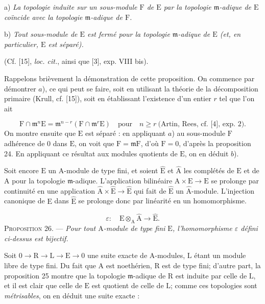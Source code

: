 a) \emph{La topologie induite sur un sous-module $\mathrm{F}$ de $\mathrm{E}$ par la topologie $\mathfrak{m}$-adique de $\mathrm{E}$ coïncide avec la topologie $\mathfrak{m}$-adique de $\mathrm{F}$.}

b) \emph{Tout sous-module de $\mathrm{E}$ est fermé pour la topologie $\mathfrak{m}$-adique de $\mathrm{E}$ (et, en particulier, $\mathrm{E}$ est séparé).}

(Cf. [15], \emph{loc. cit.}, ainsi que [3], exp. VIII bis).

Rappelons brièvement la démonstration de cette proposition. On commence par démontrer $a$), ce qui peut se faire, soit en utilisant la théorie de la décomposition primaire (Krull, cf. [15]), soit en établissant l'existence d'un entier $r$ tel que l'on ait

\begin{equation*}
\mathrm{F} \cap \mathfrak{m}^n \mathrm{E} = \mathfrak{m}^{n-r}(\mathrm{F} \cap \mathfrak{m}^r \mathrm{E}) \quad \mbox{pour} \quad n \geqslant r \ \mbox{(Artin, Rees, cf. [4], exp. 2).}
\end{equation*}
On montre ensuite que $\mathrm{E}$ est séparé : en appliquant $a$) au sous-module $\mathrm{F}$ adhérence de $0$ dans $\mathrm{E}$, on voit que $\mathrm{F} = \mathfrak{m}\mathrm{F}$, d'où $\mathrm{F} = 0$, d'après la proposition 24. En appliquant ce résultat aux modules quotients de $\mathrm{E}$, on en déduit $b$).

Soit encore $\mathrm{E}$ un $\mathrm{A}$-module de type fini, et soient $\hat{\mathrm{E}}$ et $\hat{\mathrm{A}}$ les complétés de $\mathrm{E}$ et de $\mathrm{A}$ pour la topologie $\mathfrak{m}$-adique. L'application bilinéaire $\mathrm{A} \times \mathrm{E} \to \mathrm{E}$ se prolonge par continuité en une application $\hat{\mathrm{A}} \times \hat{\mathrm{E}} \to \hat{\mathrm{E}}$ qui fait de $\hat{\mathrm{E}}$ un $\hat{\mathrm{A}}$-module. L'injection canonique de $\mathrm{E}$ dans $\hat{\mathrm{E}}$ se prolonge donc par linéarité en un homomorphisme.

\begin{equation*}
\varepsilon : \quad \mathrm{E} \otimes_\mathrm{A} \hat{\mathrm{A}} \to \hat{\mathrm{E}}.
\end{equation*}
\textsc{Proposition 26}. --- \emph{Pour tout $\mathrm{A}$-module de type fini $\mathrm{E}$, l'homomorphisme $\varepsilon$ défini ci-dessus est bijectif.}



Soit $0 \to \mathrm{R} \to \mathrm{L} \to \mathrm{E} \to 0$ une suite exacte de $\mathrm{A}$-modules, $\mathrm{L}$ étant un module libre de type fini. Du fait que $\mathrm{A}$ est noethérien, $\mathrm{R}$ est de type fini; d'autre part, la proposition 25 montre que la topologie $\mathfrak{m}$-adique de $\mathrm{R}$ est induite par celle de $\mathrm{L}$, et il est clair que celle de $\mathrm{E}$ est quotient de celle de $\mathrm{L}$; comme ces topologies sont \emph{métrisables}, on en déduit une suite exacte :

